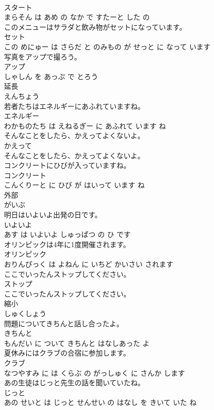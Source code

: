 \documentclass[8pt]{extreport}
\begin{document}
\begin{CJK}{UTF8}{min}
\\	スタート 
\\	まらそん は あめ の なか で すたーと した の		
\\	このメニューはサラダと飲み物がセットになっています。	
\\	セット 
\\	この めにゅー は さらだ と のみもの が せっと に なって います		
\\	写真をアップで撮ろう。	
\\	アップ 
\\	しゃしん を あっぷ で とろう		
\\	延長	
\\	えんちょう		
\\	若者たちはエネルギーにあふれていますね。	
\\	エネルギー 
\\	わかものたち は えねるぎー に あふれて います ね		
\\	そんなことをしたら、かえってよくないよ。	
\\	かえって 
\\	そんなことをしたら、かえってよくないよ。		
\\	コンクリートにひびが入っていますね。	
\\	コンクリート 
\\	こんくりーと に ひび が はいって います ね		
\\	外部	
\\	がいぶ		
\\	明日はいよいよ出発の日です。	
\\	いよいよ 
\\	あす は いよいよ しゅっぱつ の ひ です		
\\	オリンピックは4年に1度開催されます。	
\\	オリンピック 
\\	おりんぴっく は よねん に いちど かいさい されます		
\\	ここでいったんストップしてください。	
\\	ストップ 
\\	ここでいったんストップしてください。		
\\	縮小	
\\	しゅくしょう		
\\	問題についてきちんと話し合ったよ。	
\\	きちんと 
\\	もんだい に ついて きちんと はなしあった よ		
\\	夏休みにはクラブの合宿に参加します。	
\\	クラブ 
\\	なつやすみ に は くらぶ の がっしゅく に さんか します		
\\	あの生徒はじっと先生の話を聞いていたね。	
\\	じっと 
\\	あの せいと は じっと せんせい の はなし を きいて いた ね		
\end{CJK}
\end{document}
